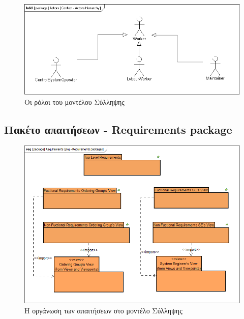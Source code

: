 \documentclass[a4paper,12pt,twoside]{report}
\begin{document}
{\begin{appendices}
				\begin{figure}[hp]
					\centering
					\includegraphics[scale=0.30]{ConceptionalModel_Contex-ActorsHierarchy.png}
					\caption{Οι ρόλοι του μοντέλου Σύλληψης}
					\label{φωτ:Οι ρόλοι του μοντέλου Σύλληψης}
				\end{figure}

			\FloatBarrier
			\subsection{Πακέτο απαιτήσεων - Requirements package}
			\clearpage
				\begin{figure}[hp]
					\centering
					\includegraphics[scale=0.45]{ConceptionalModel_pkg-Requirementspackages.png}
					\caption{Η οργάνωση των απαιτήσεων στο μοντέλο Σύλληψης}
					\label{φωτ:Η οργάνωση των απαιτήσεων στο μοντέλο Σύλληψης}
				\end{figure}
				

\end{appendices}}
\end{document}
